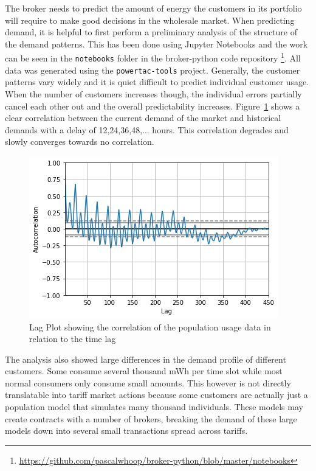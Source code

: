 The broker needs to predict the amount of energy the customers in its portfolio will require to make good decisions in
the wholesale market.
When predicting demand, it is helpful to first perform a preliminary analysis of the structure of the demand patterns.
This has been done using Jupyter Notebooks and the work can be seen in the \texttt{notebooks} folder in the
broker-python code repository
\footnote{\url{https://github.com/pascalwhoop/broker-python/blob/master/notebooks}}. All data was generated using the
\texttt{powertac-tools} project. Generally, the customer patterns
vary widely and it is quiet difficult to predict individual customer usage. When the number of customers increases
though, the individual errors partially cancel each other out and the overall predictability increases.
Figure~\ref{fig:demandtimelag} shows a clear correlation between the current demand of the market and historical demands with a
delay of 12,24,36,48,... hours. This correlation degrades and slowly converges towards no correlation.

\begin{figure}[]
    \centering
    \includegraphics[width=0.6\linewidth]{img/demand_6.png}
    \caption{Lag Plot showing the correlation of the population usage data in relation to the time lag}
    \label{fig:demandtimelag}
\end{figure}

The analysis also showed large differences in the demand profile of different customers. Some consume several thousand
\ac{mWh} per time slot while most normal consumers only consume small amounts. This however is not directly
translatable into tariff market actions because some customers are actually just a population model that simulates many
thousand individuals. These models may create contracts with a number of brokers, breaking the demand of these large
models down into several small transactions spread across tariffs.

